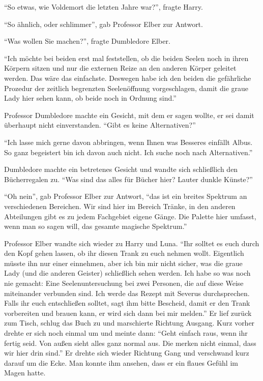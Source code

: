 \enquote{So etwas, wie Voldemort die letzten Jahre war?}, fragte Harry.

\enquote{So ähnlich, oder schlimmer}, gab Professor Elber zur Antwort.

\enquote{Was wollen Sie machen?}, fragte Dumbledore Elber.

\enquote{Ich möchte bei beiden erst mal feststellen, ob die beiden Seelen noch in ihren Körpern sitzen und nur die externen Reize an den anderen Körper geleitet werden. Das wäre das einfachste. Deswegen habe ich den beiden die gefährliche Prozedur der zeitlich begrenzten Seelenöffnung vorgeschlagen, damit die graue Lady hier sehen kann, ob beide noch in Ordnung sind.}

Professor Dumbledore machte ein Gesicht, mit dem er sagen wollte, er sei damit überhaupt nicht einverstanden. \enquote{Gibt es keine Alternativen?}

\enquote{Ich lasse mich gerne davon abbringen, wenn Ihnen was Besseres einfällt Albus. So ganz begeistert bin ich davon auch nicht. Ich suche noch nach Alternativen.}

Dumbledore machte ein betretenes Gesicht und wandte sich schließlich den Bücherregalen zu. \enquote{Was sind das alles für Bücher hier? Lauter dunkle Künste?}

\enquote{Oh nein}, gab Professor Elber zur Antwort, \enquote{das ist ein breites Spektrum an verschiedenen Bereichen. Wir sind hier im Bereich Tränke, in den anderen Abteilungen gibt es zu jedem Fachgebiet eigene Gänge. Die Palette hier umfasst, wenn man so sagen will, das gesamte magische Spektrum.}

Professor Elber wandte sich wieder zu Harry und Luna. \enquote{Ihr solltet es euch durch den Kopf gehen lassen, ob ihr diesen Trank zu euch nehmen wollt. Eigentlich müsste ihn nur einer einnehmen, aber ich bin mir nicht sicher, was die graue Lady (und die anderen Geister) schließlich sehen werden. Ich habe so was noch nie gemacht: Eine Seelenuntersuchung bei zwei Personen, die auf diese Weise miteinander verbunden sind. Ich werde das Rezept mit Severus durchsprechen. Falls ihr euch entschließen solltet, sagt ihm bitte Bescheid, damit er den Trank vorbereiten und brauen kann, er wird sich dann bei mir melden.} Er lief zurück zum Tisch, schlug das Buch zu und marschierte Richtung Ausgang. Kurz vorher drehte er sich noch einmal um und meinte dann: \enquote{Geht einfach raus, wenn ihr fertig seid. Von außen sieht alles ganz normal aus. Die merken nicht einmal, dass wir hier drin sind.} Er drehte sich wieder Richtung Gang und verschwand kurz darauf um die Ecke. Man konnte ihm ansehen, dass er ein flaues Gefühl im Magen hatte.

